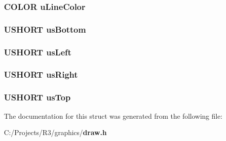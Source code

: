 \subsubsection[{uLineColor}]{\setlength{\rightskip}{0pt plus 5cm}COLOR {\bf uLineColor}}\label{struct_d_r_a_w___r_e_c_t_a_n_g_l_e___s_t_r_u_c_t_a2879a0528fce4ab4a1c9c73686a74ae6}
\subsubsection[{usBottom}]{\setlength{\rightskip}{0pt plus 5cm}USHORT {\bf usBottom}}\label{struct_d_r_a_w___r_e_c_t_a_n_g_l_e___s_t_r_u_c_t_ad758ba6a3846105fd3a29333aaaf52e5}
\subsubsection[{usLeft}]{\setlength{\rightskip}{0pt plus 5cm}USHORT {\bf usLeft}}\label{struct_d_r_a_w___r_e_c_t_a_n_g_l_e___s_t_r_u_c_t_a634d5cd3aa5edd6eaa3b43e8ffae3f30}
\subsubsection[{usRight}]{\setlength{\rightskip}{0pt plus 5cm}USHORT {\bf usRight}}\label{struct_d_r_a_w___r_e_c_t_a_n_g_l_e___s_t_r_u_c_t_ae0d01293b653d3edf3afe59650712d72}
\subsubsection[{usTop}]{\setlength{\rightskip}{0pt plus 5cm}USHORT {\bf usTop}}\label{struct_d_r_a_w___r_e_c_t_a_n_g_l_e___s_t_r_u_c_t_abe3d3cfc450f732196cc29be49b493f3}


The documentation for this struct was generated from the following file:\begin{DoxyCompactItemize}
\item 
C:/Projects/R3/graphics/{\bf draw.h}\end{DoxyCompactItemize}
